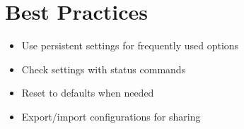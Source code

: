 \documentclass{article}
\begin{document}
\section{Best Practices}
\begin{itemize}
\item Use persistent settings for frequently used options
\item Check settings with status commands
\item Reset to defaults when needed
\item Export/import configurations for sharing
\end{itemize}
\end{document}
